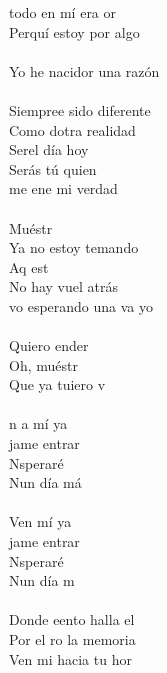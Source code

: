 \begin{cancion}
	todo en mí era or      \\
	Perquí estoy por algo  \\
\jump\\
	Yo he nacidor una razón\\
\jump\\
	Siempree sido diferente	\\
	Como dotra realidad\\
	Serel día hoy\\
Serás tú quien\\
	me ene mi verdad  \\
\jump\\
	Muéstr   \\
	Ya no estoy temando\\
	Aq est\\
	No hay vuel atrás\\
	vo esperando una va yo\\
\jump\\
	Quiero ender       \\
	Oh, muéstr   \\
	Que ya tuiero v\\
\jump\\
	n a mí ya\\
	jame entrar \\
	Nsperaré\\
	Nun día má\\
\jump\\
	Ven mí ya\\
	jame entrar \\
	Nsperaré\\
	Nun día m         \\
\jump\\
	Donde eento halla el\\
	Por el ro la memoria\\
	Ven mi hacia tu hor\\

\end{cancion}
